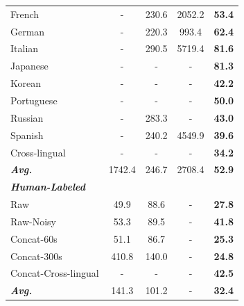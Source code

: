 \begin{table}[ht]
{\begin{tabular}{lcccc}
French                 & -                 & 230.6 & 2052.2   & \textbf{53.4}       \\
German                 & -                 & 220.3 & 993.4    & \textbf{62.4}       \\
Italian                & -                 & 290.5 & 5719.4   & \textbf{81.6}       \\
Japanese               & -                 & -     & -        & \textbf{81.3}       \\
Korean                 & -                 & -     & -        & \textbf{42.2}       \\
Portuguese             & -                 & -     & -        & \textbf{50.0}       \\
Russian                & -                 & 283.3 & -        & \textbf{43.0}       \\
Spanish                & -                 & 240.2 & 4549.9   & \textbf{39.6}       \\
Cross-lingual           & -                 & -     & -        & \textbf{34.2}       \\
\textit{\textbf{Avg.}} & 1742.4            & 246.7 & 2708.4   & \textbf{52.9}       \\ \midrule
\multicolumn{5}{l}{\textit{\textbf{Human-Labeled}}}                                 \\ \midrule
Raw                    & 49.9              & 88.6  & -        & \textbf{27.8}       \\
Raw-Noisy              & 53.3              & 89.5  & -        & \textbf{41.8}       \\
Concat-60s              & 51.1              & 86.7  & -        & \textbf{25.3}       \\
Concat-300s             & 410.8             & 140.0 & -        & \textbf{24.8}       \\
Concat-Cross-lingual     & -                 & -     & -        & \textbf{42.5}       \\
\textit{\textbf{Avg.}} & 141.3             & 101.2 & -        & \textbf{32.4}       \\ \bottomrule
\end{tabular}
}
\end{table}


